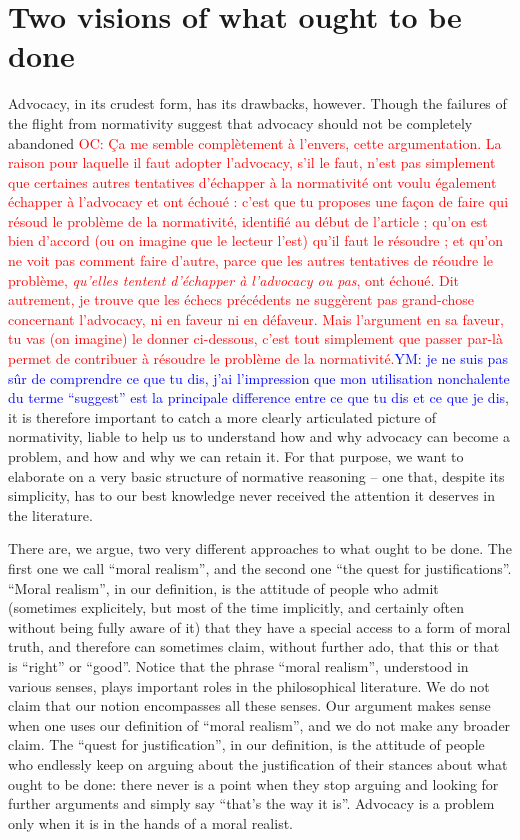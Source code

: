 \documentclass[preprint, french, english, 11pt]{elsarticle}%
\newcommand{\commentYM}[1]{\textcolor{blue}{YM: #1}}
\newcommand{\commentOC}[1]{\textcolor{red}{OC: #1}}
\begin{document}
\section{Two visions of what ought to be done}
Advocacy, in its crudest form, has its drawbacks, however. Though the failures of the flight from normativity suggest that advocacy should not be completely abandoned
\commentOC{Ça me semble complètement à l’envers, cette argumentation. La raison pour laquelle il faut adopter l’advocacy, s’il le faut, n’est pas simplement que certaines autres tentatives d’échapper à la normativité ont voulu également échapper à l’advocacy et ont échoué : c’est que tu proposes une façon de faire qui résoud le problème de la normativité, identifié au début de l’article ; qu’on est bien d’accord (ou on imagine que le lecteur l’est) qu’il faut le résoudre ; et qu’on ne voit pas comment faire d’autre, parce que les autres tentatives de réoudre le problème, \emph{qu’elles tentent d’échapper à l’advocacy ou pas}, ont échoué. Dit autrement, je trouve que les échecs précédents ne suggèrent pas grand-chose concernant l’advocacy, ni en faveur ni en défaveur. Mais l’argument en sa faveur, tu vas (on imagine) le donner ci-dessous, c’est tout simplement que passer par-là permet de contribuer à résoudre le problème de la normativité.}\commentYM{je ne suis pas sûr de comprendre ce que tu dis, j'ai l'impression que mon utilisation nonchalente du terme ``suggest'' est la principale difference entre ce que tu dis et ce que je dis}, it is therefore important to catch a more clearly articulated picture of normativity, liable to help us to understand how and why advocacy can become a problem, and how and why we can retain it. For that purpose, we want to elaborate on a very basic structure of normative reasoning -- one that, despite its simplicity, has to our best knowledge never received the attention it deserves in the literature.

There are, we argue, two very different approaches to what ought to be done. The first one we call ``moral realism'', and the second one ``the quest for justifications''.
``Moral realism'', in our definition, is the attitude of people who admit (sometimes explicitely, but most of the time implicitly, and certainly often without being fully aware of it) that they have a special access to a form of moral truth, and therefore can sometimes claim, without further ado, that this or that is ``right'' or ``good''. Notice that the phrase ``moral realism'', understood in various senses, plays important roles in the philosophical literature. We do not claim that our notion encompasses all these senses. Our argument makes sense when one uses our definition of ``moral realism'', and we do not make any broader claim. The ``quest for justification'', in our definition, is the attitude of people who endlessly keep on arguing about the justification of their stances about what ought to be done: there never is a point when they stop arguing and looking for further arguments and simply say ``that's the way it is''. Advocacy is a problem only when it is in the hands of a moral realist.
\end{document}
